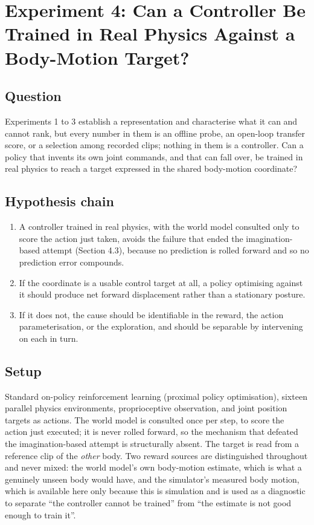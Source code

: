\documentclass[12pt,a4paper,oneside]{report}
\begin{document}
\section{Experiment 4: Can a Controller Be Trained in Real Physics Against a Body-Motion Target?}

\subsection{Question}
Experiments 1 to 3 establish a representation and characterise what it can and cannot rank, but every number in
them is an offline probe, an open-loop transfer score, or a selection among recorded clips; nothing in them is a
controller. Can a policy that invents its own joint commands, and that can fall over, be trained in real physics
to reach a target expressed in the shared body-motion coordinate?

\subsection{Hypothesis chain}
\begin{enumerate}
  \item A controller trained in real physics, with the world model consulted only to score the action just taken,
    avoids the failure that ended the imagination-based attempt (Section 4.3), because no prediction is rolled
    forward and so no prediction error compounds.
  \item If the coordinate is a usable control target at all, a policy optimising against it should produce net
    forward displacement rather than a stationary posture.
  \item If it does not, the cause should be identifiable in the reward, the action parameterisation, or the
    exploration, and should be separable by intervening on each in turn.
\end{enumerate}

\subsection{Setup}
Standard on-policy reinforcement learning (proximal policy optimisation), sixteen parallel physics environments,
proprioceptive observation, and joint position targets as actions. The world model is consulted once per step, to
score the action just executed; it is never rolled forward, so the mechanism that defeated the imagination-based
attempt is structurally absent. The target is read from a reference clip of the \emph{other} body. Two reward
sources are distinguished throughout and never mixed: the world model's own body-motion estimate, which is what a
genuinely unseen body would have, and the simulator's measured body motion, which is available here only because
this is simulation and is used as a diagnostic to separate ``the controller cannot be trained'' from ``the estimate
is not good enough to train it''.
\end{document}
